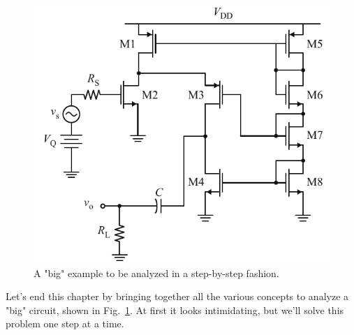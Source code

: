 \section{\topicE}
\begin{figure}[tb]
\centering
\includegraphics[scale=1]{16cascode_folded}
\caption{A "big" example to be analyzed in a step-by-step fashion.}
\label{fig:16cascode_folded}
\end{figure}
Let's end this chapter by bringing together all the various concepts to analyze a "big" circuit, shown in Fig.~\ref{fig:16cascode_folded}.  At first it looks intimidating, but we'll solve this problem one step at a time.
